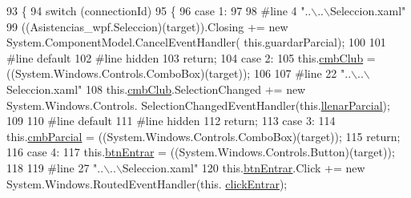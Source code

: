 \begin{DoxyCode}
93                                                                                                 \{
94             \textcolor{keywordflow}{switch} (connectionId)
95             \{
96             \textcolor{keywordflow}{case} 1:
97             
98 \textcolor{preprocessor}{            #line 4 "..\(\backslash\)..\(\backslash\)Seleccion.xaml"}
99 \textcolor{preprocessor}{}            ((Asistencias\_wpf.Seleccion)(target)).Closing += \textcolor{keyword}{new} System.ComponentModel.CancelEventHandler(\textcolor{keyword}{
      this}.guardarParcial);
100             
101 \textcolor{preprocessor}{            #line default}
102 \textcolor{preprocessor}{}\textcolor{preprocessor}{            #line hidden}
103 \textcolor{preprocessor}{}            \textcolor{keywordflow}{return};
104             \textcolor{keywordflow}{case} 2:
105             this.\hyperlink{class_asistencias__wpf_1_1_seleccion_adac0d1aa55be26c4cff9a610ee20b9c5}{cmbClub} = ((System.Windows.Controls.ComboBox)(target));
106             
107 \textcolor{preprocessor}{            #line 22 "..\(\backslash\)..\(\backslash\)Seleccion.xaml"}
108 \textcolor{preprocessor}{}            this.\hyperlink{class_asistencias__wpf_1_1_seleccion_adac0d1aa55be26c4cff9a610ee20b9c5}{cmbClub}.SelectionChanged += \textcolor{keyword}{new} System.Windows.Controls.
      SelectionChangedEventHandler(this.\hyperlink{class_asistencias__wpf_1_1_seleccion_a202ae9606e4234345de3f89402572d0b}{llenarParcial});
109             
110 \textcolor{preprocessor}{            #line default}
111 \textcolor{preprocessor}{}\textcolor{preprocessor}{            #line hidden}
112 \textcolor{preprocessor}{}            \textcolor{keywordflow}{return};
113             \textcolor{keywordflow}{case} 3:
114             this.\hyperlink{class_asistencias__wpf_1_1_seleccion_a24db3199864aca68b55959ae7477bb3b}{cmbParcial} = ((System.Windows.Controls.ComboBox)(target));
115             \textcolor{keywordflow}{return};
116             \textcolor{keywordflow}{case} 4:
117             this.\hyperlink{class_asistencias__wpf_1_1_seleccion_a7c5e0a561a721c40c2173b532d0995cf}{btnEntrar} = ((System.Windows.Controls.Button)(target));
118             
119 \textcolor{preprocessor}{            #line 27 "..\(\backslash\)..\(\backslash\)Seleccion.xaml"}
120 \textcolor{preprocessor}{}            this.\hyperlink{class_asistencias__wpf_1_1_seleccion_a7c5e0a561a721c40c2173b532d0995cf}{btnEntrar}.Click += \textcolor{keyword}{new} System.Windows.RoutedEventHandler(this.
      \hyperlink{class_asistencias__wpf_1_1_seleccion_ab8e85da35b7eb9e11d124c20d1ca63d0}{clickEntrar});

\end{DoxyCode}
